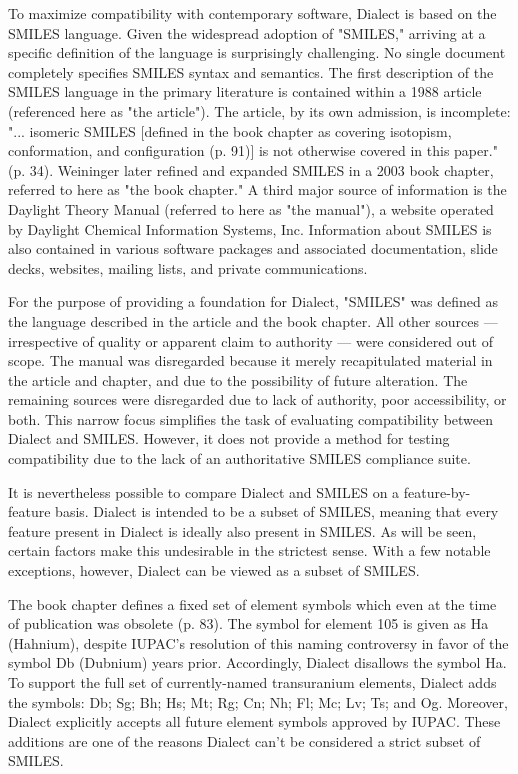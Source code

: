 \documentclass{article}
\begin{document}
To maximize compatibility with contemporary software, Dialect is based on the SMILES language. Given the widespread adoption of "SMILES," arriving at a specific definition of the language is surprisingly challenging. No single document completely specifies SMILES syntax and semantics. The first description of the SMILES language in the primary literature is contained within a 1988 article (referenced here as "the article").\cite{weininger:1988} The article, by its own admission, is incomplete: "... isomeric SMILES [defined in the book chapter as covering isotopism, conformation, and configuration (p. 91)] is not otherwise covered in this paper." (p. 34). Weininger later refined and expanded SMILES in a 2003 book chapter,\cite{weininger2008} referred to here as "the book chapter." A third major source of information is the Daylight Theory Manual (referred to here as "the manual"), a website operated by Daylight Chemical Information Systems, Inc.\cite{daylightTheory} Information about SMILES is also contained in various software packages and associated documentation, slide decks, websites, mailing lists, and private communications.

For the purpose of providing a foundation for Dialect, "SMILES" was defined as the language described in the article and the book chapter. All other sources --- irrespective of quality or apparent claim to authority --- were considered out of scope. The manual was disregarded because it merely recapitulated material in the article and chapter, and due to the possibility of future alteration. The remaining sources were disregarded due to lack of authority, poor accessibility, or both. This narrow focus simplifies the task of evaluating compatibility between Dialect and SMILES. However, it does not provide a method for testing compatibility due to the lack of an authoritative SMILES compliance suite.

It is nevertheless possible to compare Dialect and SMILES on a feature-by-feature basis. Dialect is intended to be a subset of SMILES, meaning that every feature present in Dialect is ideally also present in SMILES. As will be seen, certain factors make this undesirable in the strictest sense. With a few notable exceptions, however, Dialect can be viewed as a subset of SMILES.

The book chapter defines a fixed set of element symbols which even at the time of publication was obsolete (p. 83). The symbol for element 105 is given as Ha (Hahnium), despite IUPAC's resolution of this naming controversy in favor of the symbol Db (Dubnium) years prior.\cite{ohrstrom1997} Accordingly, Dialect disallows the symbol Ha. To support the full set of currently-named transuranium elements, Dialect adds the symbols: Db; Sg; Bh; Hs; Mt; Rg; Cn; Nh; Fl; Mc; Lv; Ts; and Og. Moreover, Dialect explicitly accepts all future element symbols approved by IUPAC. These additions are one of the reasons Dialect can't be considered a strict subset of SMILES.
\end{document}
